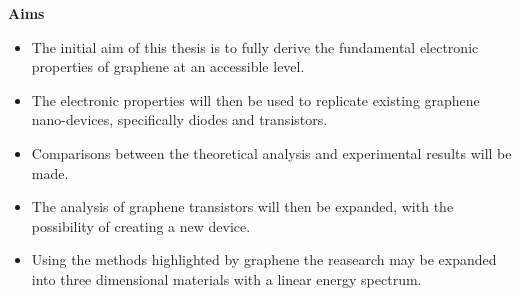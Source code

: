 %
\thispagestyle{plain}
\begin{center}
	\Large
	\textbf{Aims}
\end{center}
\begin{itemize}
	\item The initial aim of this thesis is to fully derive the fundamental electronic properties of graphene at an accessible level.

	\item The electronic properties will then be used to replicate existing graphene nano-devices, specifically diodes and transistors.

	\item Comparisons between the theoretical analysis and experimental results will be made.

	\item The analysis of graphene transistors will then be expanded, with the possibility of creating a new device.

	\item Using the methods highlighted by graphene the reasearch may be expanded into three dimensional materials with a linear energy spectrum.
\end{itemize}
%
